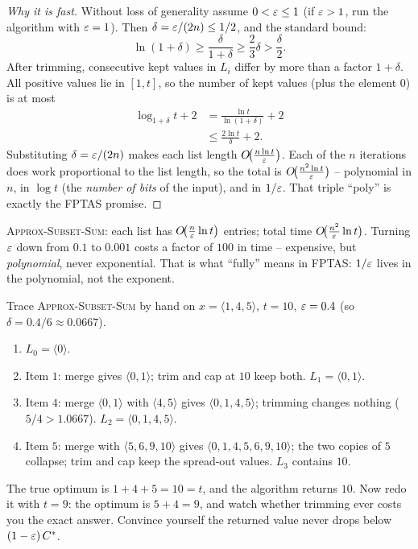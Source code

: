 \begin{proof}[Why it is fast]
Without loss of generality assume $0 < \varepsilon \le 1$ (if $\varepsilon > 1$, run the
algorithm with $\varepsilon = 1$). Then $\delta = \varepsilon/(2n) \le 1/2$, and the standard
bound:
\[
\ln(1+\delta) \ge \frac{\delta}{1+\delta} \ge \frac{2}{3}\delta > \frac{\delta}{2} .
\]
After trimming, consecutive kept values in $L_i$ differ by more than a factor
$1+\delta$. All positive values lie in $[1,t]$, so the number of kept values
(plus the element $0$) is at most
\begin{align*}
\log_{1+\delta} t + 2 &= \frac{\ln t}{\ln(1+\delta)} + 2 \\
&\le \frac{2\ln t}{\delta} + 2.
\end{align*}
Substituting
$\delta = \varepsilon/(2n)$ makes each list length $O\!\big(\tfrac{n\ln t}{\varepsilon}\big)$.
Each of the $n$ iterations does work proportional to the list length, so the
total is $O\!\big(\tfrac{n^{2}\ln t}{\varepsilon}\big)$ -- polynomial in $n$, in
$\log t$ (the \emph{number of bits} of the input), and in $1/\varepsilon$. That
triple ``poly'' is exactly the FPTAS promise. \qedhere
\end{proof}

\begin{complexitybox}
\textsc{Approx-Subset-Sum}: each list has $O\!\big(\tfrac{n}{\varepsilon}\ln t\big)$
entries; total time $O\!\big(\tfrac{n^{2}}{\varepsilon}\ln t\big)$. Turning $\varepsilon$
down from $0.1$ to $0.001$ costs a factor of $100$ in time -- expensive, but
\emph{polynomial}, never exponential. That is what ``fully'' means
in FPTAS: $1/\varepsilon$ lives in the polynomial, not the exponent.
\end{complexitybox}

\begin{labbox}
Trace \textsc{Approx-Subset-Sum} by hand on $x=\langle 1, 4, 5\rangle$,
$t=10$, $\varepsilon=0.4$ (so $\delta = 0.4/6 \approx 0.0667$).
\begin{enumerate}
\item $L_0=\langle 0\rangle$.
\item Item $1$: merge gives $\langle 0,1\rangle$; trim and cap at $10$ keep
both. $L_1=\langle 0,1\rangle$.
\item Item $4$: merge $\langle 0,1\rangle$ with $\langle 4,5\rangle$ gives
$\langle 0,1,4,5\rangle$; trimming changes nothing ($5/4 > 1.0667$).
$L_2=\langle 0,1,4,5\rangle$.
\item Item $5$: merge with $\langle 5,6,9,10\rangle$ gives
$\langle 0,1,4,5,6,9,10\rangle$; the two copies of $5$ collapse; trim and cap
keep the spread-out values. $L_3$ contains $10$.
\end{enumerate}
The true optimum is $1+4+5=10=t$, and the algorithm returns $10$. Now redo it
with $t=9$: the optimum is $5+4=9$, and watch whether trimming ever costs you
the exact answer. Convince yourself the returned value never drops below
$(1-\varepsilon)\,C^{*}$.
\end{labbox}

